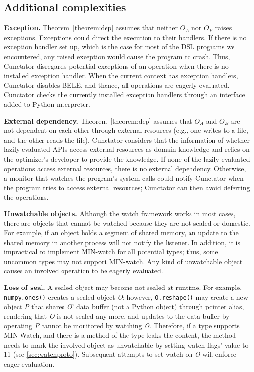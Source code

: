 \documentclass[sigconf]{acmart}\settopmatter{printfolios=true,printccs=false,printacmref=false}\setcopyright{none}
\newcommand {\REV}[1]{#1}
\begin{document}
\vspace{-.1in}
\subsection{Additional complexities}
\label{sec:special}

\vspace{0.1in}
\noindent\textbf{Exception.} Theorem~\ref{theorem:dep} assumes that neither $O_A$ nor $O_B$ raises exceptions. Exceptions could direct the execution to their handlers. If there is no exception handler set up, which is the case for most of the DSL programs we encountered, any raised exception would cause the program to crash. Thus, Cunctator disregards potential exceptions of an operation when there is no installed exception handler. When the current context has exception handlers, Cunctator disables BELE, and thence, all operations are eagerly evaluated. Cunctator checks the currently installed exception handlers through an interface added to Python interpreter.

\noindent\textbf{External dependency.} Theorem~\ref{theorem:dep} assumes that $O_A$ and $O_B$ are not dependent on each other through external resources (e.g., one writes to a file, and the other reads the file). Cunctator considers that the information of whether lazily evaluated APIs access external resources as domain knowledge and relies on the optimizer's developer to provide the knowledge. If none of the lazily evaluated operations access external resources, there is no external dependency. Otherwise, a monitor that watches the program's system calls could notify Cunctator when the program tries to access external resources; Cunctator can then avoid deferring the operations. 

\noindent\textbf{Unwatchable objects.} Although the watch framework works in most cases, there are objects that cannot be watched because they are not sealed or domestic. For example, if an object holds a segment of shared memory, an update to the shared memory in another process will not notify the listener. In addition, it is impractical to implement MIN-watch for all potential types; thus, some uncommon types may not support MIN-watch. Any kind of unwatchable object causes an involved operation to be eagerly evaluated.

\noindent\textbf{Loss of seal.} \REV{A sealed object may become not sealed at runtime. For example, \texttt{numpy.ones()} creates a sealed object \textit{O}; however, \texttt{O.reshape()} may create a new object \textit{P} that shares \textit{O}' data buffer (not a Python object) through pointer alias, rendering that \textit{O} is not sealed any more, and updates to the data buffer by operating \textit{P} cannot be monitored by watching \textit{O}. Therefore, if a type supports MIN-Watch, and there is a method of the type leaks the content, the method needs to mark the involved object as unwatchable by setting watch flags' value to 11 (see \cref{sec:watchproto}). Subsequent attempts to set watch on \textit{O} will enforce eager evaluation.}
\end{document}
